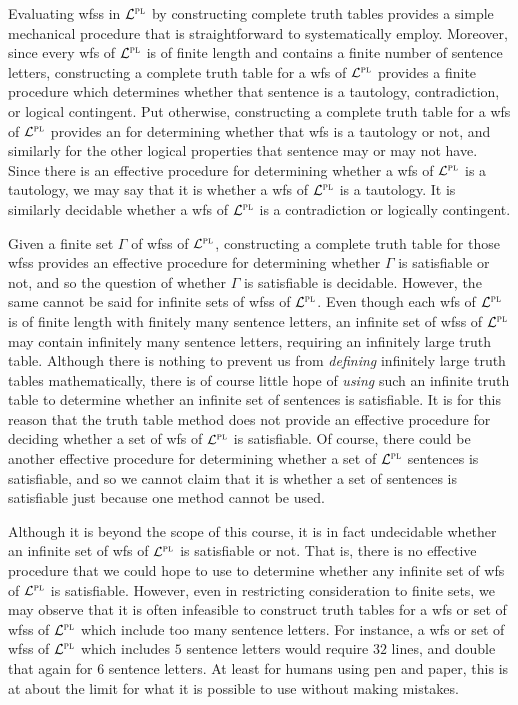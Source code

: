Evaluating wfss in $\mathcal{L}^{\textsc{pl}}$ by constructing complete truth tables provides a simple mechanical procedure that is straightforward to systematically employ.
Moreover, since every wfs of $\mathcal{L}^{\textsc{pl}}$ is of finite length and contains a finite number of sentence letters, constructing a complete truth table for a wfs of $\mathcal{L}^{\textsc{pl}}$ provides a finite procedure which determines whether that sentence is a tautology, contradiction, or logical contingent.
Put otherwise, constructing a complete truth table for a wfs of $\mathcal{L}^{\textsc{pl}}$ provides an  for determining whether that wfs is a tautology or not, and similarly for the other logical properties that sentence may or may not have.
Since there is an effective procedure for determining whether a wfs of $\mathcal{L}^{\textsc{pl}}$ is a tautology, we may say that it is  whether a wfs of $\mathcal{L}^{\textsc{pl}}$ is a tautology.
It is similarly decidable whether a wfs of $\mathcal{L}^{\textsc{pl}}$ is a contradiction or logically contingent.

Given a finite set $\Gamma$ of wfss of $\mathcal{L}^{\textsc{pl}}$, constructing a complete truth table for those wfss provides an effective procedure for determining whether $\Gamma$ is satisfiable or not, and so the question of whether $\Gamma$ is satisfiable is decidable. 
However, the same cannot be said for infinite sets of wfss of $\mathcal{L}^{\textsc{pl}}$.
Even though each wfs of $\mathcal{L}^{\textsc{pl}}$ is of finite length with finitely many sentence letters, an infinite set of wfss of $\mathcal{L}^{\textsc{pl}}$ may contain infinitely many sentence letters, requiring an infinitely large truth table.
Although there is nothing to prevent us from \textit{defining} infinitely large truth tables mathematically, there is of course little hope of \textit{using} such an infinite truth table to determine whether an infinite set of sentences is satisfiable.
It is for this reason that the truth table method does not provide an effective procedure for deciding whether a set of wfs of $\mathcal{L}^{\textsc{pl}}$ is satisfiable. 
Of course, there could be another effective procedure for determining whether a set of $\mathcal{L}^{\textsc{pl}}$ sentences is satisfiable, and so we cannot claim that it is  whether a set of sentences is satisfiable just because one method cannot be used.

Although it is beyond the scope of this course, it is in fact undecidable whether an infinite set of wfs of $\mathcal{L}^{\textsc{pl}}$ is satisfiable or not.
That is, there is no effective procedure that we could hope to use to determine whether any infinite set of wfs of $\mathcal{L}^{\textsc{pl}}$ is satisfiable. %
However, even in restricting consideration to finite sets, we may observe that it is often infeasible to construct truth tables for a wfs or set of wfss of $\mathcal{L}^{\textsc{pl}}$ which include too many sentence letters.
For instance, a wfs or set of wfss of $\mathcal{L}^{\textsc{pl}}$ which includes $5$ sentence letters would require $32$ lines, and double that again for $6$ sentence letters. 
At least for humans using pen and paper, this is at about the limit for what it is possible to use without making mistakes.

